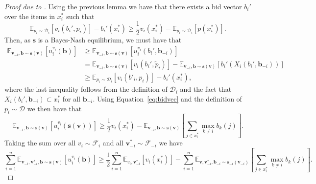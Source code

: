 \begin{proof}[Proof due to \cite{10.1145/2488608.2488634}]
  Using the previous lemma we have that there exists a bid vector $ b_i' $ over the items in $ x^{*}_i $ such that
  \begin{equation}
    \label{eq:bidvec}
    \mathbb{E}_{p_i \sim \mathcal{D}_i}[v_i(b_i', p_i)] - b_i'(x^{*}_i) \geq \frac{1}{2}v_i(x^{*}_i) - \mathbb{E}_{p_i \sim \mathcal{D}_i}[p(x^{*}_i)].
  \end{equation}
  Then, as $ \mathbf{s} $ is a Bayes-Nash equilibrium, we must have that
  \begin{align*}
    \mathbb{E}_{\mathbf{v}_{-i}, \mathbf{b} \sim \mathbf{s}(\mathbf{v})}[u_i^{v_i}(\mathbf{b})] &\geq \mathbb{E}_{\mathbf{v}_{-i}, \mathbf{b} \sim \mathbf{s}(\mathbf{v})}[u_i^{v_i}(b_i', \mathbf{b}_{-i})]\\
                                                                                          &=\mathbb{E}_{\mathbf{v}_{-i}, \mathbf{b} \sim \mathbf{s}(\mathbf{v})}[v_i(b_i', \tilde{p}_i)] - \mathbb{E}_{\mathbf{v}_{-i}, \mathbf{b} \sim \mathbf{s}(\mathbf{v})}[b_i'(X_i(b_i', \mathbf{b}_{-i}))] \\
                                                                                          &\geq \mathbb{E}_{p_i \sim \mathcal{D}_i}[v_i(b'_i, p_i)] - b_i'(x^*_i),
  \end{align*}
  where the last inequality follows from the definition of $ \mathcal{D}_i $ and the fact that $ X_i(b_i', \mathbf{b}_{-i}) \subset x^{*}_i $ for all $ \mathbf{b}_{-i} $. Using Equation~\ref{eq:bidvec} and the definition of $ p_i \sim \mathcal{D} $ we then have that
  \begin{equation}
    \mathbb{E}_{\mathbf{v}_{-i}, \mathbf{b}\sim \mathbf{s}(\mathbf{v})} \left[ u_i^{v_i}(\mathbf{s}(\mathbf{v})) \right] \geq \frac{1}{2}v_i(x^{*}_i) - \mathbb{E}_{\mathbf{v}_{-i}, \mathbf{b}\sim \mathbf{s}(\mathbf{v})}\left[ \sum_{j \in x^{*}_i} \max_{k \neq i}b_k(j) \right]
  .\end{equation}
  Taking the sum over all $ v_i \sim \mathcal{F}_i $ and all $ \mathbf{v}_{-i}^{*} \sim \mathcal{F}_{-i} $ we have
  \begin{equation}
    \sum_{i = 1}^{n} \mathbb{E}_{\mathbf{v}_{-i}, \mathbf{v}^{*}_{-i}, \mathbf{b}\sim \mathbf{s}(\mathbf{v})}[u_i^{v_i}(\mathbf{b})] \geq \frac{1}{2}\sum_{i = 1}^{n} \mathbb{E}_{v_i, \mathbf{v}^{*}_{-i}}[v_i(x_i^{*})] - \sum_{i = 1}^{n} \mathbb{E}_{\mathbf{v}, \mathbf{v}_{-i}^{*}, \mathbf{b}_{-i} \sim \mathbf{s}_{-i}(\mathbf{v}_{-i})}\left[ \sum_{j \in x^{*}_i} \max_{k \neq i} b_k(j)\right]
  .\end{equation}

\end{proof}
